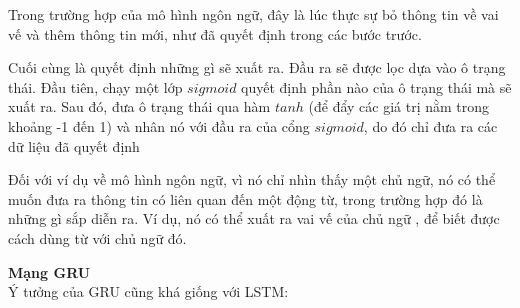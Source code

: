 Trong trường hợp của mô hình ngôn ngữ, đây là lúc thực sự bỏ thông tin về vai vế và thêm thông tin mới, như đã quyết
định trong các bước trước.
\begin{figure}[!htb]
\end{figure}
Cuối cùng là quyết định những gì sẽ xuất ra. Đầu ra sẽ được lọc dựa vào ô trạng thái. Đầu tiên, chạy một lớp
\(sigmoid\) quyết định phần nào của ô trạng thái mà sẽ xuất ra. Sau đó, đưa ô trạng thái qua hàm
\(tanh\) (để đẩy các giá trị nằm trong khoảng -1 đến 1) và nhân nó với đầu ra của cổng \(sigmoid\), do đó chỉ đưa ra
các dữ liệu đã quyết định

Đối với ví dụ về mô hình ngôn ngữ, vì nó chỉ nhìn thấy một chủ ngữ, nó có thể muốn đưa ra thông tin có liên quan đến
một động từ, trong trường hợp đó là những gì sắp diễn ra. Ví dụ, nó có thể xuất ra vai vế của chủ ngữ , để biết được
cách dùng từ với chủ ngữ đó.

\textbf{Mạng GRU} \\[0.2em]
Ý tưởng của GRU cũng khá giống với LSTM:

